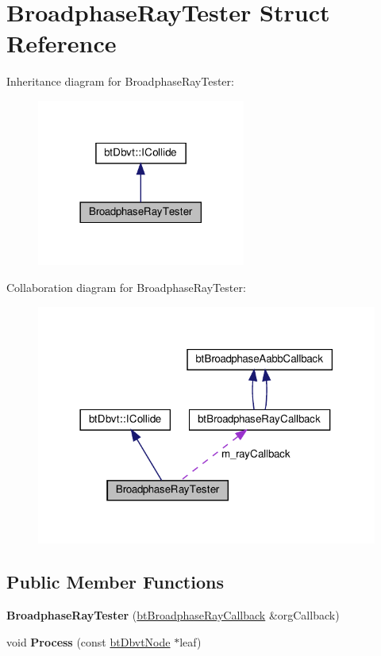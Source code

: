\hypertarget{structBroadphaseRayTester}{}\section{Broadphase\+Ray\+Tester Struct Reference}
\label{structBroadphaseRayTester}


Inheritance diagram for Broadphase\+Ray\+Tester\+:
\nopagebreak
\begin{figure}[H]
\begin{center}
\leavevmode
\includegraphics[width=194pt]{structBroadphaseRayTester__inherit__graph}
\end{center}
\end{figure}


Collaboration diagram for Broadphase\+Ray\+Tester\+:
\nopagebreak
\begin{figure}[H]
\begin{center}
\leavevmode
\includegraphics[width=318pt]{structBroadphaseRayTester__coll__graph}
\end{center}
\end{figure}
\subsection*{Public Member Functions}
\begin{DoxyCompactItemize}
\item 
\mbox{\label{structBroadphaseRayTester_aa0e0bf4dca0a049ad6fc26bfb2801aaa}} 
{\bfseries Broadphase\+Ray\+Tester} (\hyperlink{structbtBroadphaseRayCallback}{bt\+Broadphase\+Ray\+Callback} \&org\+Callback)
\item 
\mbox{\label{structBroadphaseRayTester_a2a9dd034c197741d920ac0e3d1106e6a}} 
void {\bfseries Process} (const \hyperlink{structbtDbvtNode}{bt\+Dbvt\+Node} $\ast$leaf)
\end{DoxyCompactItemize}
